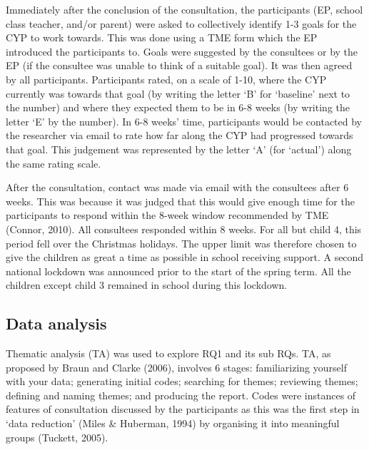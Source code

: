 \documentclass[
  english,
  man,floatsintext]{apa6}
\begin{document}
Immediately after the conclusion of the consultation, the participants
(EP, school class teacher, and/or parent) were asked to collectively
identify 1-3 goals for the CYP to work towards. This was done using a
TME form which the EP introduced the participants to. Goals were
suggested by the consultees or by the EP (if the consultee was unable to
think of a suitable goal). It was then agreed by all participants.
Participants rated, on a scale of 1-10, where the CYP currently was
towards that goal (by writing the letter `B' for `baseline' next to the
number) and where they expected them to be in 6-8 weeks (by writing the
letter `E' by the number). In 6-8 weeks' time, participants would be
contacted by the researcher via email to rate how far along the CYP had
progressed towards that goal. This judgement was represented by the
letter `A' (for `actual') along the same rating scale.

After the consultation, contact was made via email with the consultees
after 6 weeks. This was because it was judged that this would give
enough time for the participants to respond within the 8-week window
recommended by TME (Connor, 2010). All
consultees responded within 8 weeks. For all but child 4, this period
fell over the Christmas holidays. The upper limit was therefore chosen
to give the children as great a time as possible in school receiving
support. A second national lockdown was announced prior to the start of
the spring term. All the children except child 3 remained in school
during this lockdown.

\hypertarget{data-analysis}{%
\subsection{Data analysis}\label{data-analysis}}

Thematic analysis (TA) was used to explore RQ1 and its sub RQs. TA, as proposed by Braun and Clarke (2006), involves 6 stages: familiarizing yourself with your data; generating initial
codes; searching for themes; reviewing themes; defining and naming
themes; and producing the report. Codes were instances of features of
consultation discussed by the participants as this was the first step in
`data reduction' (Miles \& Huberman, 1994) by organising it
into meaningful groups (Tuckett, 2005).
\end{document}
